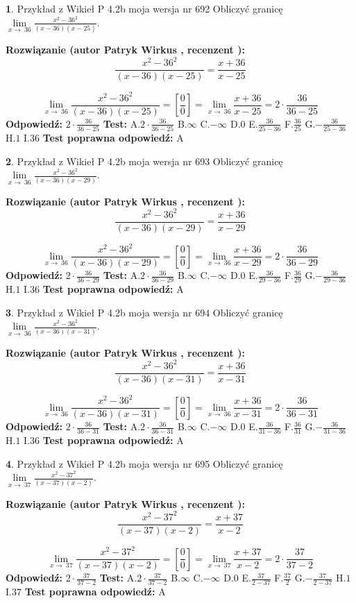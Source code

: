 \documentclass[12pt, a4paper]{article}
\theoremstyle{definition} %
\newtheorem{zad}{}
\newcommand{\zadStart}[1]{\begin{zad}#1\newline}
\newcommand{\zadStop}{\end{zad}}
\newcommand{\rozwStart}[2]{\noindent \textbf{Rozwiązanie (autor #1 , recenzent #2): }\newline}
\newcommand{\rozwStop}{\newline}
\newcommand{\odpStart}{\noindent \textbf{Odpowiedź:}\newline}
\newcommand{\odpStop}{\newline}
\newcommand{\testStart}{\noindent \textbf{Test:}\newline}
\newcommand{\testStop}{\newline}
\newcommand{\kluczStart}{\noindent \textbf{Test poprawna odpowiedź:}\newline}
\newcommand{\kluczStop}{\newline}
\begin{document}
\zadStart{Przykład z Wikieł P 4.2b moja wersja nr 692}
Obliczyć granicę $\lim\limits_{x\to\ 36}\frac{x^{2}-36^{2}}{(x-36)(x-25)}$.
\zadStop
\rozwStart{Patryk Wirkus}{}
$$\frac{x^{2}-36^{2}}{(x-36)(x-25)}=\frac{x+36}{x-25}$$

$$\lim\limits_{x\to\ 36}\frac{x^{2}-36^{2}}{(x-36)(x-25)}=[\frac{0}{0}]=\lim\limits_{x\to\ 36}\frac{x+36}{x-25}=2 \cdot \frac{36}{36-25}$$
\rozwStop
\odpStart
$2 \cdot \frac{36}{36-25}$
\odpStop
\testStart
A.$2 \cdot \frac{36}{36-25}$
B.$\infty$
C.$-\infty$
D.$0$
E.$\frac{36}{25-36}$
F.$\frac{36}{25}$
G.$-\frac{36}{25-36}$
H.$1$
I.$36$
\testStop
\kluczStart
A
\kluczStop



\zadStart{Przykład z Wikieł P 4.2b moja wersja nr 693}
Obliczyć granicę $\lim\limits_{x\to\ 36}\frac{x^{2}-36^{2}}{(x-36)(x-29)}$.
\zadStop
\rozwStart{Patryk Wirkus}{}
$$\frac{x^{2}-36^{2}}{(x-36)(x-29)}=\frac{x+36}{x-29}$$

$$\lim\limits_{x\to\ 36}\frac{x^{2}-36^{2}}{(x-36)(x-29)}=[\frac{0}{0}]=\lim\limits_{x\to\ 36}\frac{x+36}{x-29}=2 \cdot \frac{36}{36-29}$$
\rozwStop
\odpStart
$2 \cdot \frac{36}{36-29}$
\odpStop
\testStart
A.$2 \cdot \frac{36}{36-29}$
B.$\infty$
C.$-\infty$
D.$0$
E.$\frac{36}{29-36}$
F.$\frac{36}{29}$
G.$-\frac{36}{29-36}$
H.$1$
I.$36$
\testStop
\kluczStart
A
\kluczStop



\zadStart{Przykład z Wikieł P 4.2b moja wersja nr 694}
Obliczyć granicę $\lim\limits_{x\to\ 36}\frac{x^{2}-36^{2}}{(x-36)(x-31)}$.
\zadStop
\rozwStart{Patryk Wirkus}{}
$$\frac{x^{2}-36^{2}}{(x-36)(x-31)}=\frac{x+36}{x-31}$$

$$\lim\limits_{x\to\ 36}\frac{x^{2}-36^{2}}{(x-36)(x-31)}=[\frac{0}{0}]=\lim\limits_{x\to\ 36}\frac{x+36}{x-31}=2 \cdot \frac{36}{36-31}$$
\rozwStop
\odpStart
$2 \cdot \frac{36}{36-31}$
\odpStop
\testStart
A.$2 \cdot \frac{36}{36-31}$
B.$\infty$
C.$-\infty$
D.$0$
E.$\frac{36}{31-36}$
F.$\frac{36}{31}$
G.$-\frac{36}{31-36}$
H.$1$
I.$36$
\testStop
\kluczStart
A
\kluczStop



\zadStart{Przykład z Wikieł P 4.2b moja wersja nr 695}
Obliczyć granicę $\lim\limits_{x\to\ 37}\frac{x^{2}-37^{2}}{(x-37)(x-2)}$.
\zadStop
\rozwStart{Patryk Wirkus}{}
$$\frac{x^{2}-37^{2}}{(x-37)(x-2)}=\frac{x+37}{x-2}$$

$$\lim\limits_{x\to\ 37}\frac{x^{2}-37^{2}}{(x-37)(x-2)}=[\frac{0}{0}]=\lim\limits_{x\to\ 37}\frac{x+37}{x-2}=2 \cdot \frac{37}{37-2}$$
\rozwStop
\odpStart
$2 \cdot \frac{37}{37-2}$
\odpStop
\testStart
A.$2 \cdot \frac{37}{37-2}$
B.$\infty$
C.$-\infty$
D.$0$
E.$\frac{37}{2-37}$
F.$\frac{37}{2}$
G.$-\frac{37}{2-37}$
H.$1$
I.$37$
\testStop
\kluczStart
A
\kluczStop
\end{document}
